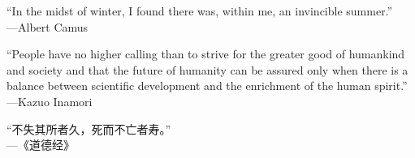 


\begin{center}

\vspace{100pt}
``In the midst of winter, I found there was, within me, an invincible summer.''
\\
\vspace{20pt}
\hfill ---Albert Camus
\\
\vspace{60pt}

``People have no higher calling than to strive for the greater good of humankind and society and that the future of humanity can be assured only when there is a balance between scientific development and the enrichment of the human spirit.''
\\
\vspace{20pt}
\hfill ---Kazuo Inamori
\\
\vspace{60pt}

\begin{CJK}{UTF8}{gbsn}
``不失其所者久，死而不亡者寿。''
\\
\vspace{20pt}
\hfill ---《道德经》
\end{CJK}

\end{center}

\restoregeometry

